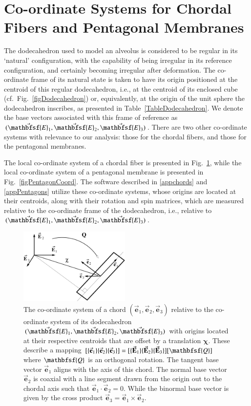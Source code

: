 \section{Co-ordinate Systems for Chordal Fibers and Pentagonal Membranes}

The dodecahedron used to model an alveolus is considered to be regular in its `natural' configuration, with the capability of being irregular in its reference configuration, and certainly becoming irregular after deformation.  The co-ordinate frame of its natural state is taken to have its origin positioned at the centroid of this regular dodecahedron, i.e., at the centroid of its enclosed cube (cf.\ Fig.~\ref{figDodecahedron}) or, equivalently, at the origin of the unit sphere the dodecahedron inscribes, as presented in Table~\ref{TableDodecahedron}.  We denote the base vectors associated with this frame of reference as $( \vec{\mathbfsf{E}}_1 , \vec{\mathbfsf{E}}_2 , \vec{\mathbfsf{E}}_3 )$.  There are two other co-ordinate systems with relevance to our analysis: those for the chordal fibers, and those for the pentagonal membranes.

The local co-ordinate system of a chordal fiber is presented in Fig.~\ref{figchord}, while the local co-ordinate system of a pentagonal membrane is presented in Fig.~\ref{figPentagonCoord}.  The software described in \ref{appchords} and \ref{appPentagons} utilize these co-ordinate systems, whose origins are located at their centroids, along with their rotation and spin matrices, which are measured relative to the co-ordinate frame of the dodecahedron, i.e., relative to $( \vec{\mathbfsf{E}}_1 , \vec{\mathbfsf{E}}_2 , \vec{\mathbfsf{E}}_3 )$.

\begin{figure}
    \centering
    \includegraphics[width=5.5cm]{figures/chord.pdf}
    \caption{The co-ordinate system of a chord $( \vec{\mathbf{e}}_1 , \vec{\mathbf{e}}_2 , \vec{\mathbf{e}}_3 )$ relative to the co-ordinate system of its dodecahedron $( \vec{\mathbfsf{E}}_1 , \vec{\mathbfsf{E}}_2 , \vec{\mathbfsf{E}}_3 )$ with origins located at their respective centroids that are offset by a translation $\boldsymbol{\chi}$.  These describe a mapping $[ \{ \vec{\mathbf{e}}_1 \} \{ \vec{\mathbf{e}}_2 \} \{ \vec{\mathbf{e}}_3 \} ] = [ \{ \vec{\mathbf{E}}_1 \} \{ \vec{\mathbf{E}}_2 \} \{ \vec{\mathbf{E}}_3 \} ] [ \mathbfsf{Q} ]$ where $\mathbfsf{Q}$ is an orthogonal rotation.  The tangent base vector $\vec{\mathbf{e}}_1$ aligns with the axis of this chord. The normal base vector $\vec{\mathbf{e}}_2$ is coaxial with a line segment drawn from the origin out to the chordal axis such that $\vec{\mathbf{e}}_1 \cdot \vec{\mathbf{e}}_2 = 0$. While the binormal base vector is given by the cross product $\vec{\mathbf{e}}_3 = \vec{\mathbf{e}}_1 \times \vec{\mathbf{e}}_2$.}
    \label{figchord}
\end{figure}

